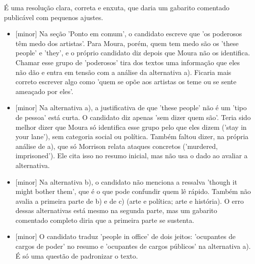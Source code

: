 \documentclass{article}%
\begin{document}
\newline%
É uma resolução clara, correta e enxuta, que daria um gabarito comentado publicável com pequenos ajustes.%
\begin{itemize}%
\item%
{[}minor{]} Na seção 'Ponto em comum', o candidato escreve que 'os poderosos têm medo dos artistas'. Para Moura, porém, quem tem medo são os 'these people' e 'they', e o próprio candidato diz depois que Moura não os identifica. Chamar esse grupo de 'poderosos' tira dos textos uma informação que eles não dão e entra em tensão com a análise da alternativa a). Ficaria mais correto escrever algo como 'quem se opõe aos artistas os teme ou se sente ameaçado por eles'.%
\item%
{[}minor{]} Na alternativa a), a justificativa de que 'these people' não é um 'tipo de pessoa' está curta. O candidato diz apenas 'sem dizer quem são'. Teria sido melhor dizer que Moura só identifica esse grupo pelo que eles dizem ('stay in your lane'), sem categoria social ou política. Também faltou dizer, na própria análise de a), que só Morrison relata ataques concretos ('murdered, imprisoned'). Ele cita isso no resumo inicial, mas não usa o dado ao avaliar a alternativa.%
\item%
{[}minor{]} Na alternativa b), o candidato não menciona a ressalva 'though it might bother them', que é o que pode confundir quem lê rápido. Também não avalia a primeira parte de b) e de c) (arte e política; arte e história). O erro dessas alternativas está mesmo na segunda parte, mas um gabarito comentado completo diria que a primeira parte se sustenta.%
\item%
{[}minor{]} O candidato traduz 'people in office' de dois jeitos: 'ocupantes de cargos de poder' no resumo e 'ocupantes de cargos públicos' na alternativa a). É só uma questão de padronizar o texto.%
\end{itemize}%
\end{document}
